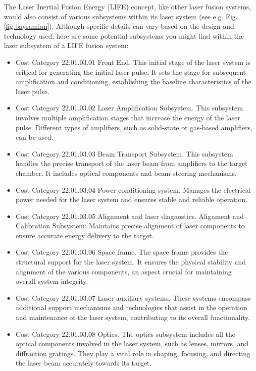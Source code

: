 The Laser Inertial Fusion Energy (LIFE) concept, like other laser fusion systems, would also consist of various subsystems within its laser  
 system (see e.g. Fig.  \ref{fig:bayramian}). Although specific details can vary based on the design and technology used, here are some potential subsystems you might find within  the laser subsystem of a LIFE fusion system:    
   \begin{itemize} 
   \item Cost Category 22.01.03.01 Front End. This initial stage of the laser system is critical for generating the initial laser pulse. It sets the stage for subsequent amplification and conditioning, establishing the baseline characteristics of the laser pulse.
   \item Cost Category 22.01.03.02 Laser Amplification Subsystem. This subsystem involves multiple amplification stages that increase the energy of the laser pulse. Different types of amplifiers, such as solid-state or gas-based amplifiers, can be used.   
   \item Cost Category 22.01.03.03 Beam Transport Subsystem. This subsystem handles the precise transport of the laser beam from amplifiers to the target chamber. It includes optical components and beam-steering mechanisms.   
   \item Cost Category 22.01.03.04 Power conditioning system. Manages the electrical power needed for the laser system and ensures stable and reliable operation.
   \item Cost Category 22.01.03.05 Alignment and laser diagnostics.  Alignment and Calibration Subsystem: Maintains precise alignment of laser components to ensure accurate energy delivery to the target.
   \item Cost Category 22.01.03.06 Space frame. The space frame provides the structural support for the laser system. It ensures the physical stability and alignment of the various components, an aspect crucial for maintaining overall system integrity.
   \item Cost Category 22.01.03.07 Laser auxiliary systems. These systems encompass additional support mechanisms and technologies that assist in the operation and maintenance of the laser system, contributing to its overall functionality.
   \item Cost Category 22.01.03.08 Optics. The optics subsystem includes all the optical components involved in the laser system, such as lenses, mirrors, and diffraction gratings. They play a vital role in shaping, focusing, and directing the laser beam accurately towards its target.

   \end{itemize}   
   

